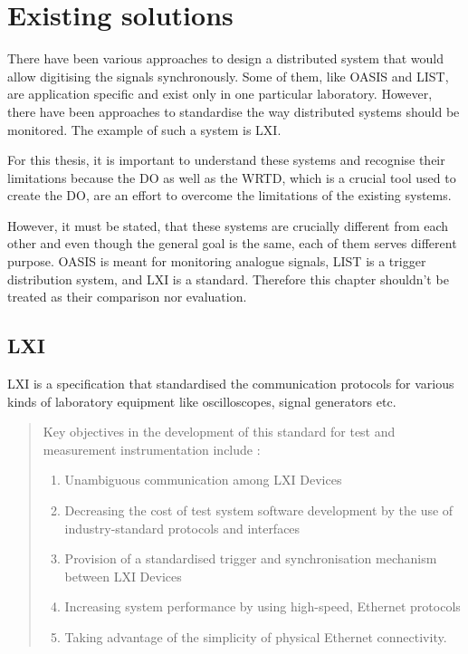 \chapter{Existing solutions} \label{chapter:existing_solutions}
There have been various approaches to design a distributed system that would allow digitising the signals synchronously. Some of them, like OASIS and LIST, are application specific and exist only in one particular laboratory. However, there have been approaches to standardise the way distributed systems should be monitored. The example of such a system is LXI.

For this thesis, it is important to understand these systems and recognise their limitations because the DO as well as the WRTD, which is a crucial tool used to create the DO, are an effort to overcome the limitations of the existing systems.

However, it must be stated, that these systems are crucially different from each other and even though the general goal is the same, each of them serves different purpose. OASIS is meant for monitoring analogue signals, LIST is a trigger distribution system, and LXI is a standard. Therefore this chapter shouldn't be treated as their comparison nor evaluation.

\section{LXI}
    LXI is a specification that standardised the communication protocols for various kinds of laboratory equipment like oscilloscopes, signal generators etc.
    \blockquote[]{
    Key objectives in the development of this standard for test and measurement instrumentation
    include {\cite[8]{specification:LXI}}:
    \begin{enumerate}
        \item Unambiguous communication among LXI Devices
        \item Decreasing the cost of test system software development by the use of industry-standard protocols and interfaces
        \item Provision of a standardised trigger and synchronisation mechanism between LXI Devices
        \item Increasing system performance by using high-speed, Ethernet protocols
        \item Taking advantage of the simplicity of physical Ethernet connectivity.
    \end{enumerate}
    }

